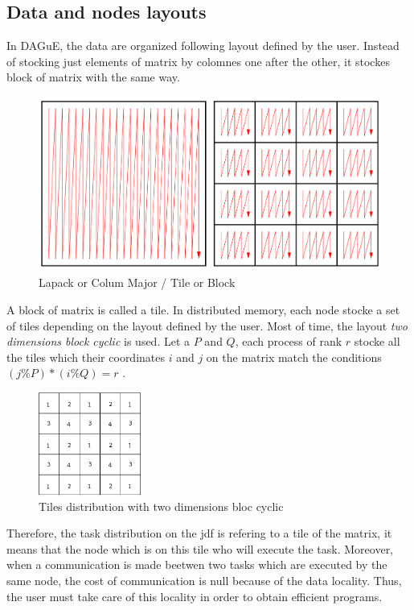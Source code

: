 \documentclass{report}
\begin{document}
\subsection{Data and nodes layouts}
In DAGuE, the data are organized following layout defined by the user. Instead of stocking just elements of matrix by colomnes one after the other, it stockes block of matrix with the same way. 
\begin{figure}[!ht]
\begin{center}
\includegraphics[width=\textwidth]{data_layout.png} 
\end{center}
\caption{Lapack or Colum Major / Tile or Block}
\end{figure}
A block of matrix is called a tile. In distributed memory, each node stocke a set of tiles depending on the layout defined by the user. Most of time, the layout \textit{two dimensions block cyclic} is used. Let a $P$ and $Q$, each process of rank $r$ stocke all the tiles which their coordinates $i$ and $j$ on the matrix match the conditions $(j\%P)*(i\%Q)=r$ .
\begin{figure}[!ht]
\begin{center}
\includegraphics[width=0.3\textwidth]{node_layout.png} 
\end{center}
\caption{Tiles distribution with two dimensions bloc cyclic}
\end{figure}
Therefore, the task distribution on the jdf is refering to a tile of the matrix, it means that the node which is on this tile who will execute the task. Moreover, when a communication is made beetwen two tasks which are executed by the same node, the cost of communication is null because of the data locality. Thus, the user must take care of this locality in order to obtain efficient programs.
\end{document}
